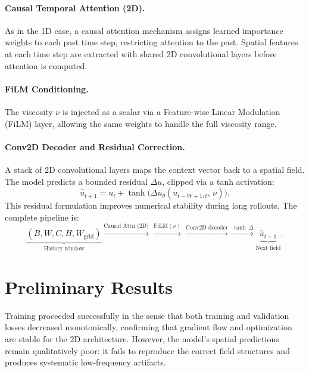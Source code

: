 \paragraph{Causal Temporal Attention (2D).}
As in the 1D case, a causal attention mechanism assigns learned importance weights to each past time step, restricting attention to the past. Spatial features at each time step are extracted with shared 2D convolutional layers before attention is computed.

\paragraph{FiLM Conditioning.}
The viscosity $\nu$ is injected as a scalar via a Feature-wise Linear Modulation (FiLM) layer, allowing the same weights to handle the full viscosity range.

\paragraph{Conv2D Decoder and Residual Correction.}
A stack of 2D convolutional layers maps the context vector back to a spatial field. The model predicts a bounded residual $\Delta u$, clipped via a tanh activation:
\[
  \hat{u}_{t+1} = u_t + \tanh\!\bigl(\Delta u_{\theta}(u_{t-W+1:t},\, \nu)\bigr).
\]
This residual formulation improves numerical stability during long rollouts. The complete pipeline is:
\[
  \underbrace{(B,W,C,H,W_{\text{grid}})}_{\text{History window}}
  \xrightarrow{\text{Causal Attn (2D)}}
  \xrightarrow{\text{FiLM}(\nu)}
  \xrightarrow{\text{Conv2D decoder}}
  \xrightarrow{\tanh\,\Delta}
  \underbrace{\hat{u}_{t+1}}_{\text{Next field}}.
\]

\section{Preliminary Results}
\label{sec:2d_results}

Training proceeded successfully in the sense that both training and validation losses decreased monotonically, confirming that gradient flow and optimization are stable for the 2D architecture. However, the model's spatial predictions remain qualitatively poor: it fails to reproduce the correct field structures and produces systematic low-frequency artifacts.

